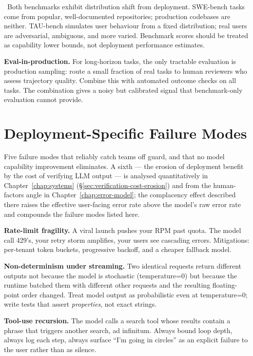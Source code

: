 \Emp\ Both benchmarks exhibit distribution shift from
deployment. SWE-bench tasks come from popular, well-documented
repositories; production codebases are neither. TAU-bench
simulates user behaviour from a fixed distribution; real users
are adversarial, ambiguous, and more varied. Benchmark scores
should be treated as capability lower bounds, not deployment
performance estimates.

\textbf{Eval-in-production.} For long-horizon tasks, the only
tractable evaluation is production sampling: route a small
fraction of real tasks to human reviewers who assess trajectory
quality. Combine this with automated outcome checks on all tasks.
The combination gives a noisy but calibrated signal that
benchmark-only evaluation cannot provide.

\section{Deployment-Specific Failure Modes}
\label{sec:wk11_failure_modes}

Five failure modes that reliably catch teams off guard, and that
no model capability improvement eliminates. A sixth --- the
erosion of deployment benefit by the cost of verifying LLM
output --- is analysed quantitatively in
Chapter~\ref{chap:systems} (\S\ref{sec:verification-cost-erosion}) and from
the human-factors angle in Chapter~\ref{chap:error-model}; the complacency effect
described there raises the effective user-facing error rate
above the model's raw error rate and compounds the failure
modes listed here.

\textbf{Rate-limit fragility.} A viral launch pushes your RPM
past quota. The model call 429's, your retry storm amplifies,
your users see cascading errors. Mitigations: per-tenant token
buckets, progressive backoff, and a cheaper fallback model.

\textbf{Non-determinism under streaming.} Two identical requests
return different outputs not because the model is stochastic
(temperature=0) but because the runtime batched them with
different other requests and the resulting floating-point order
changed. Treat model output as probabilistic even at
temperature=0; write tests that assert \emph{properties}, not
exact strings.

\textbf{Tool-use recursion.} The model calls a search tool whose
results contain a phrase that triggers another search, ad
infinitum. Always bound loop depth, always log each step, always
surface ``I'm going in circles'' as an explicit failure to the
user rather than as silence.

